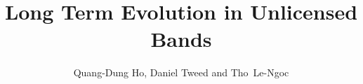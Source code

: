 \documentclass[graybox,envcountchap,sectrefs]{svmono}
\begin{document}

\author{Quang-Dung Ho, Daniel Tweed and \mbox{Tho Le-Ngoc}}
\title{Long Term Evolution in Unlicensed Bands}
\maketitle

\frontmatter%


%


%
\tableofcontents
%


\mainmatter%
%








%

%
%

\end{document}
